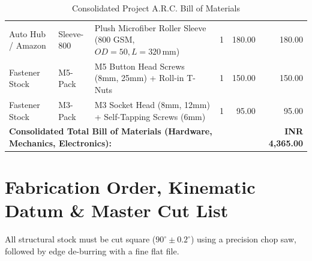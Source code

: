 \documentclass[10pt,a4paper]{article}
\begin{document}
\begin{table}[H]
\begin{tabularx}{\textwidth}{l l p{6.0cm} r r r}
Auto Hub / Amazon & Sleeve-800 & Plush Microfiber Roller Sleeve (800 GSM, $OD=50, L=320\,\text{mm}$) & 1 & 180.00 & 180.00 \\
Fastener Stock & M5-Pack & M5 Button Head Screws (8mm, 25mm) + Roll-in T-Nuts & 1 & 150.00 & 150.00 \\
Fastener Stock & M3-Pack & M3 Socket Head (8mm, 12mm) + Self-Tapping Screws (6mm) & 1 & 95.00 & 95.00 \\
\midrule
\multicolumn{5}{l}{\textbf{Consolidated Total Bill of Materials (Hardware, Mechanics, Electronics):}} & \textbf{INR 4,365.00} \\
\bottomrule
\end{tabularx}
\caption{Consolidated Project A.R.C. Bill of Materials}
\label{tab:master_bom}
\end{table}

\clearpage

\section{Fabrication Order, Kinematic Datum \& Master Cut List}

All structural stock must be cut square ($90^\circ \pm 0.2^\circ$) using a precision chop saw, followed by edge de-burring with a fine flat file.
\end{document}
